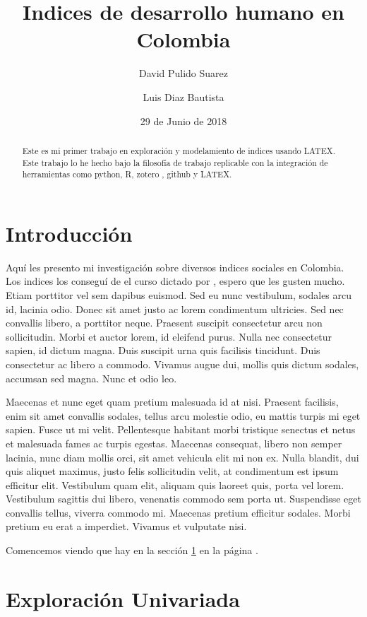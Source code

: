 \documentclass{article}
\title{Indices de desarrollo humano en Colombia}
\author[1]{\normalsize David Pulido Suarez}
\author[2]{\normalsize Luis Diaz Bautista}
\affil[1,2]{\small  Facultad de Ingenier\'ia,Universidad de los Andes\\
\texttt{{ds.pulido10,lc.diaz12}@uniandes.edu.col}}
\date{29 de Junio de 2018}
\begin{document}


\maketitle


\begin{abstract}
Este es mi primer trabajo en exploraci\'on y modelamiento de indices usando LATEX. Este trabajo lo he hecho bajo la filosof\'ia de trabajo replicable con la integraci\'on de herramientas como python, R, zotero , github y LATEX. 
\end{abstract}

\section*{Introducci\'on}

Aqu\'i les presento mi investigaci\'on sobre diversos indices sociales en Colombia. Los indices los consegu\'i de el curso dictado por \textbf{\cite{magallanes}}, espero que les gusten mucho. Etiam porttitor vel sem dapibus euismod. Sed eu nunc vestibulum, sodales arcu id, lacinia odio. Donec sit amet justo ac lorem condimentum ultricies. Sed nec convallis libero, a porttitor neque. Praesent suscipit consectetur arcu non sollicitudin. Morbi et auctor lorem, id eleifend purus. Nulla nec consectetur sapien, id dictum magna. Duis suscipit urna quis facilisis tincidunt. Duis consectetur ac libero a commodo. Vivamus augue dui, mollis quis dictum sodales, accumsan sed magna. Nunc et odio leo.

Maecenas et nunc eget quam pretium malesuada id at nisi. Praesent facilisis, enim sit amet convallis sodales, tellus arcu molestie odio, eu mattis turpis mi eget sapien. Fusce ut mi velit. Pellentesque habitant morbi tristique senectus et netus et malesuada fames ac turpis egestas. Maecenas consequat, libero non semper lacinia, nunc diam mollis orci, sit amet vehicula elit mi non ex. Nulla blandit, dui quis aliquet maximus, justo felis sollicitudin velit, at condimentum est ipsum efficitur elit. Vestibulum quam elit, aliquam quis laoreet quis, porta vel lorem. Vestibulum sagittis dui libero, venenatis commodo sem porta ut. Suspendisse eget convallis tellus, viverra commodo mi. Maecenas pretium efficitur sodales. Morbi pretium eu erat a imperdiet. Vivamus et vulputate nisi.

Comencemos viendo que hay en la secci\'on \ref{univariada} en la p\'agina \pageref{univariada}.

\clearpage
\section{Exploraci\'on Univariada}\label{univariada}

\clearpage
\label{bivariada}

\clearpage

\clearpage

\renewcommand{\refname}{Referencias}

\end{document}
